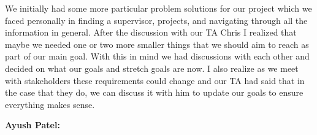 \documentclass{article}
\begin{document}
\begin{enumerate}
          We initially had some more particular problem solutions for our
          project which we faced personally in finding a supervisor, projects,
          and navigating through all the information in general. After the
          discussion with our TA Chris I realized that maybe we needed one or
          two more smaller things that we should aim to reach as part of our
          main goal. With this in mind we had discussions with each other and
          decided on what our goals and stretch goals are now. I also realize
          as we meet with stakeholders these requirements could change and our
          TA had said that in the case that they do, we can discuss it with him
          to update our goals to ensure everything makes sense.

\end{enumerate}

\textbf{Ayush Patel:}
\end{document}
